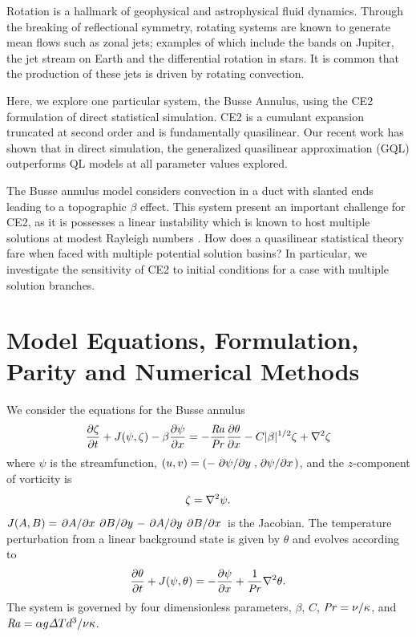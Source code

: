 \documentclass{jfm}
\newcommand{\Rayleigh}{\mbox{\textit{Ra}}}  %
\begin{document}
Rotation is a hallmark of geophysical and astrophysical fluid dynamics.
Through the breaking of reflectional symmetry, rotating systems are known to generate mean flows such as zonal jets; examples of which include the bands on Jupiter, the jet stream on Earth and the differential rotation in stars.
It is common that the production of these jets is driven by rotating convection.


Here, we explore one particular system, the Busse Annulus, using the CE2 formulation of direct statistical simulation.
CE2 is a cumulant expansion truncated at second order and is fundamentally quasilinear.
Our recent work \citep{2018RSPSA.47480422T} has shown that in direct simulation, the generalized quasilinear approximation (GQL) outperforms QL models at all parameter values explored.

The Busse annulus model considers convection in a duct with slanted ends leading to a topographic $\beta$ effect.
This system present an important challenge for CE2, as it is possesses a linear instability which is known to host multiple solutions at modest Rayleigh numbers \citep{bh1993}.
How does a quasilinear statistical theory fare when faced with multiple potential solution basins?
In particular, we investigate the sensitivity of CE2 to initial conditions for a case with multiple solution branches.

\section{Model Equations, Formulation, Parity and Numerical Methods}
\label{sec:model-eqations}

We consider the equations for the Busse annulus \citep[e.g.][]{bh1993, rj2006}
\begin{equation}
  \label{eq:zeta_eom}
  \pdv{\zeta}{t} + J(\psi, \zeta) - \beta \pdv{\psi}{x} = -\frac{\Rayleigh}{\Pran} \pdv{\theta}{x} -C |\beta|^{1/2} \zeta + \laplacian{\zeta}
\end{equation}
where $\psi$ is the streamfunction, $(u,v) = (-\pdv*{\psi}{y}, \pdv*{\psi}{x})$, and the $z$-component of vorticity is 
\begin{equation}
  \label{eq:zeta_def}
  \zeta = \laplacian{\psi}.
\end{equation}
$J(A, B) = \pdv*{A}{x}\pdv*{B}{y} - \pdv*{A}{y}\pdv*{B}{x}$ is the Jacobian. 
The temperature perturbation from a linear background state is given by $\theta$ and evolves according to
%
\begin{equation}
  \label{eq:theta}
  \pdv{\theta}{t} + J(\psi, \theta) = -\pdv{\psi}{x} + \frac{1}{\mbox{\textit{Pr}}} \nabla^2 \theta.
\end{equation}
The system is governed by four dimensionless parameters, $\beta$, $C$, $\mbox{\textit{Pr}} = \nu/
\kappa$, and $\Rayleigh = \alpha g \Delta T d^3/\nu \kappa$.
\end{document}
